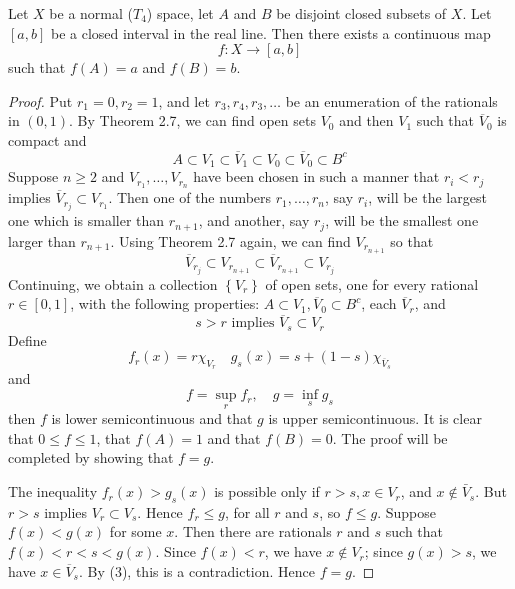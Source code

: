 \documentclass[12pt, a4paper, oneside]{book}
\begin{document}
\begin{theorem}
    Let $X$ be a normal ($T_4$) space, let $A$ and $B$ be disjoint closed subsets of $X$. Let $[a, b]$ be a closed interval in the real line. Then there exists a continuous map
    \begin{equation*}
        f: X \longrightarrow[a, b]
    \end{equation*}
    such that $f(A)=a$ and $f(B)=b$.
    \begin{proof}
        Put $r_1=0, r_2=1$, and let $r_3, r_4, r_3, \ldots$ be an enumeration of the rationals in $( 0,1 )$. By Theorem 2.7, we can find open sets $V_0$ and then $V_1$ such that $\overline{V}_0$ is compact and
        \begin{equation*}
            A \subset V_1 \subset \overline{V}_1 \subset V_0 \subset \overline{V}_0 \subset B^c
        \end{equation*}
        Suppose $n \geq 2$ and $V_{r_1}, \ldots, V_{r_n}$ have been chosen in such a manner that $r_i<r_j$ implies $\overline{V}_{r_j} \subset V_{r_1}$. Then one of the numbers $r_1, \ldots, r_n$, say $r_i$, will be the largest one which is smaller than $r_{n+1}$, and another, say $r_j$, will be the smallest one larger than $r_{n+1}$. Using Theorem 2.7 again, we can find $V_{r_{n+1}}$ so that
        \begin{equation*}
            \overline{V}_{r_ j} \subset V_{r_{n+1}} \subset \overline{V}_{r_{n+1}} \subset V_{r_j}
        \end{equation*}
        Continuing, we obtain a collection $\left\{V_r\right\}$ of open sets, one for every rational $r \in[0,1]$, with the following properties: $A \subset V_1, \overline{V}_0 \subset B^c$, each $\overline{V}_r$, and
        \begin{equation*}
            s>r \text { implies } \overline{V}_s \subset V_r
        \end{equation*}
        Define
        \begin{equation*}
            f_r(x)
            =
            r \chi_{V_r}
            \quad
            g_s(x)
            =
            s + (1-s)\chi_{\overline{V}_s}
        \end{equation*}
        and
        \begin{equation*}
            f=\sup _r f_r, \quad g=\inf _s g_s
        \end{equation*}
        then $f$ is lower semicontinuous and that $g$ is upper semicontinuous. It is clear that $0 \leq f \leq 1$, that
        $f(A)=1$ and that $f(B)=0$.
        The proof will be completed by showing that $f=g$.

        The inequality $f_r(x)>g_s(x)$ is possible only if $r>s, x \in V_r$, and $x \notin \bar{V}_s$. But $r>s$ implies $V_r \subset V_s$. Hence $f_r \leq g$, for all $r$ and $s$, so $f \leq g$.
        Suppose $f(x)<g(x)$ for some $x$. Then there are rationals $r$ and $s$ such that $f(x)<r<s<g(x)$. Since $f(x)<r$, we have $x \notin V_r$; since $g(x)>s$, we have $x \in \overline{V}_s$. By (3), this is a contradiction. Hence $f=g$.
    \end{proof}
\end{theorem}
\end{document}
